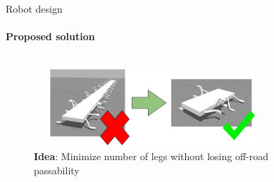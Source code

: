 \documentclass[aspectratio=169]{beamer}
\begin{document}
\begin{frame}[t]{Robot design}
    \framesubtitle{Proposed solution}
    \begin{columns}[T,onlytextwidth]
        \begin{column}{0.49\textwidth}
            \begin{figure}[H]
                \centering\includegraphics[height=3cm,width=1\textwidth,keepaspectratio]{optimization_idea.png}
                \caption*{\textbf{Idea}: Minimize number of legs without losing off-road passability}
                \label{fig{optimization_idea.png}}
            \end{figure}
        \end{column}
        \begin{column}{0.49\textwidth}
            \vspace{-2cm}
            \begin{figure}[H]
                \centering
\end{figure}
\end{column}
\end{columns}
\end{frame}
\end{document}
